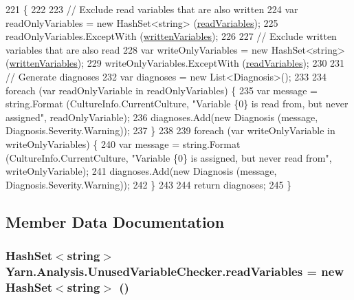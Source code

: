 \begin{DoxyCode}
221         \{
222 
223             \textcolor{comment}{// Exclude read variables that are also written}
224             var readOnlyVariables = \textcolor{keyword}{new} HashSet<string> (\hyperlink{a00163_a6b542092ddce1b92c9455d60899518a9}{readVariables});
225             readOnlyVariables.ExceptWith (\hyperlink{a00163_a0c2fe6eded1b10b135ca2469f5980a39}{writtenVariables});
226 
227             \textcolor{comment}{// Exclude written variables that are also read}
228             var writeOnlyVariables = \textcolor{keyword}{new} HashSet<string> (\hyperlink{a00163_a0c2fe6eded1b10b135ca2469f5980a39}{writtenVariables});
229             writeOnlyVariables.ExceptWith (\hyperlink{a00163_a6b542092ddce1b92c9455d60899518a9}{readVariables});
230 
231             \textcolor{comment}{// Generate diagnoses}
232             var diagnoses = \textcolor{keyword}{new} List<Diagnosis>();
233 
234             \textcolor{keywordflow}{foreach} (var readOnlyVariable \textcolor{keywordflow}{in} readOnlyVariables) \{
235                 var message = string.Format (CultureInfo.CurrentCulture, \textcolor{stringliteral}{"Variable \{0\} is read from, but
       never assigned"}, readOnlyVariable);
236                 diagnoses.Add(\textcolor{keyword}{new} Diagnosis (message, Diagnosis.Severity.Warning));
237             \}
238 
239             \textcolor{keywordflow}{foreach} (var writeOnlyVariable \textcolor{keywordflow}{in} writeOnlyVariables) \{
240                 var message = string.Format (CultureInfo.CurrentCulture, \textcolor{stringliteral}{"Variable \{0\} is assigned, but
       never read from"}, writeOnlyVariable);
241                 diagnoses.Add(\textcolor{keyword}{new} Diagnosis (message, Diagnosis.Severity.Warning));
242             \}
243 
244             \textcolor{keywordflow}{return} diagnoses;
245         \}
\end{DoxyCode}


\subsection{Member Data Documentation}
\hypertarget{a00163_a6b542092ddce1b92c9455d60899518a9}{
\subsubsection[{read\-Variables}]{\setlength{\rightskip}{0pt plus 5cm}Hash\-Set$<$string$>$ Yarn.\-Analysis.\-Unused\-Variable\-Checker.\-read\-Variables = new Hash\-Set$<$string$>$ ()\hspace{0.3cm}{\ttfamily [private]}}}\label{a00163_a6b542092ddce1b92c9455d60899518a9}


